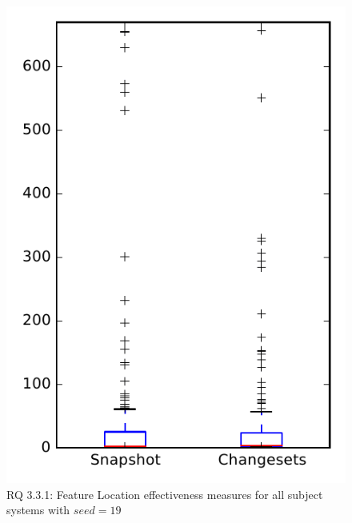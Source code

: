 
\begin{figure}
\centering
\includegraphics[height=0.4\textheight]{figures/flt_seed/rq1_overview_19}
\caption{RQ 3.3.1: Feature Location effectiveness measures for all subject systems with $seed=19$}
\label{fig:flt_seed:rq1:overview}
\end{figure}
